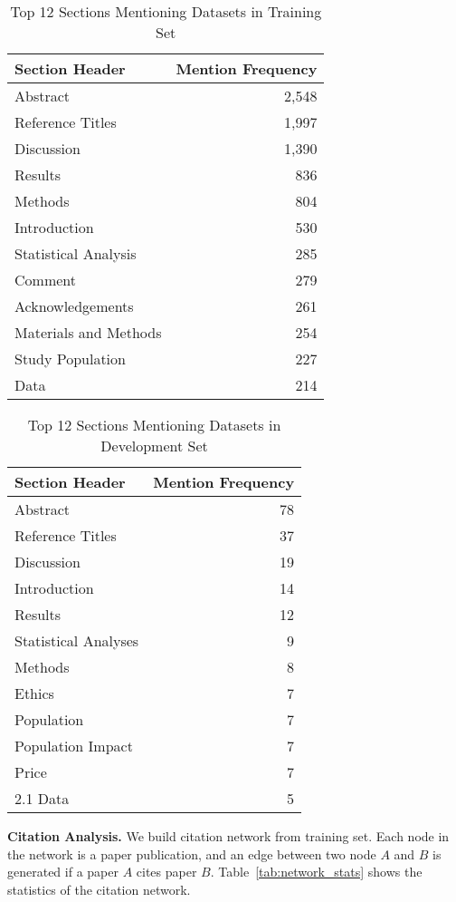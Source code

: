 \begin{table}[t!]
\begin{center}
\begin{tabular}{|l|r|}
\hline
Section Header & Mention Frequency \\
\hline
Abstract & 2,548  \\
Reference Titles & 1,997 \\
Discussion & 1,390 \\
Results & 836 \\
Methods & 804 \\
Introduction & 530 \\
Statistical Analysis & 285 \\
Comment & 279 \\
Acknowledgements & 261 \\
Materials and Methods & 254 \\
Study Population & 227 \\
Data & 214 \\
\hline
\end{tabular}
\end{center}
\caption{\label{tab:train_top_sections} Top 12 Sections Mentioning Datasets in Training Set}
\end{table}

\begin{table}[t!]
\begin{center}
\begin{tabular}{|l|r|}
\hline
Section Header & Mention Frequency \\
\hline
Abstract & 78  \\
Reference Titles & 37 \\
Discussion & 19 \\
Introduction & 14 \\
Results & 12 \\
Statistical Analyses & 9 \\
Methods & 8 \\
Ethics & 7 \\
Population & 7 \\
Population Impact & 7 \\
Price & 7 \\
2.1 Data & 5 \\
\hline
\end{tabular}
\end{center}
\caption{\label{tab:dev_top_sections} Top 12 Sections Mentioning Datasets in Development Set}
\end{table}

\textbf{Citation Analysis.} We build citation network from training set. Each node in the network is a paper publication, and an edge between two node $A$ and $B$ is generated if a paper $A$ cites paper $B$. Table~\ref{tab:network_stats} shows the statistics of the citation network.

